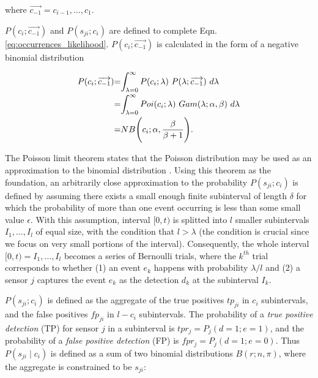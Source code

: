 \noindent where $\overrightarrow{c_{-1}} = c_{i-1}, \ldots, c_1$.

$P(c_i ; \overrightarrow{c_{-1}})$ and $P(s_{ji} ; c_i)$ are defined to complete Eqn. \ref{eq:occurrences_likelihood}. $P(c_i ; \overrightarrow{c_{-1}})$ is calculated in the form of a negative binomial distribution

\begin{equation}
	\label{eq:unconditional_xi}
	\begin{tabular}{r@{=}l}
		$P(c_i ; \overrightarrow{c_{-1}})$ & $\displaystyle\int_{\lambda=0}^{\infty} P(c_i ; \lambda) ~ P(\lambda ; \overrightarrow{c_{-1}}) ~d\lambda$ \\ [2ex]
		& $\displaystyle\int_{\lambda=0}^{\infty} Poi(c_i ; \lambda) ~ Gam(\lambda ; \alpha, \beta) ~d\lambda$ \\ [2ex]
		& $NB\Bigg(c_i ; \alpha, \displaystyle\frac{\beta}{\beta + 1}\Bigg)$.
	\end{tabular}
\end{equation}

The Poisson limit theorem states that the Poisson distribution may be used as an approximation to the binomial distribution \cite{papoulis2002probability}. Using this theorem as the foundation, an arbitrarily close approximation to the probability $P(s_{ji} ; c_i)$ is defined by assuming there exists a small enough finite subinterval of length $\delta$ for which the probability of more than one event occurring is less than some small value $ \epsilon$. With this assumption, interval $[0, t)$ is splitted into $l$ smaller subintervals $I_1, \ldots, I_l$ of equal size, with the condition that $l > \lambda$ (the condition is crucial since we focus on very small portions of the interval). Consequently, the whole interval $[0, t) = I_1, \ldots, I_l$ becomes a series of Bernoulli trials, where the $k^{th}$ trial corresponds to whether (1) an event $e_k$ happens with probability $\lambda / l$ and (2) a sensor $j$ captures the event $e_k$ as the detection $d_k$ at the subinterval $I_k$.

$P(s_{ji} ; c_i)$ is defined as the aggregate of the true positives $tp_{ji}$ in $c_i$ subintervals, and the false positives $fp_{ji}$ in $l-c_i$ subintervals. The probability of a \textit{true positive detection} (TP) for sensor $j$ in a subinterval is $tpr_j = P_j(d = 1 ; e=1)$, and the probability of a \textit{false positive detection} (FP) is $fpr_j = P_j(d = 1 ; e=0)$. Thus $P(s_{ji} \mid c_i)$ is defined as a sum of two binomial distributions $B(r ; n,\pi)$, where the aggregate is constrained to be $s_{ji}$: 

